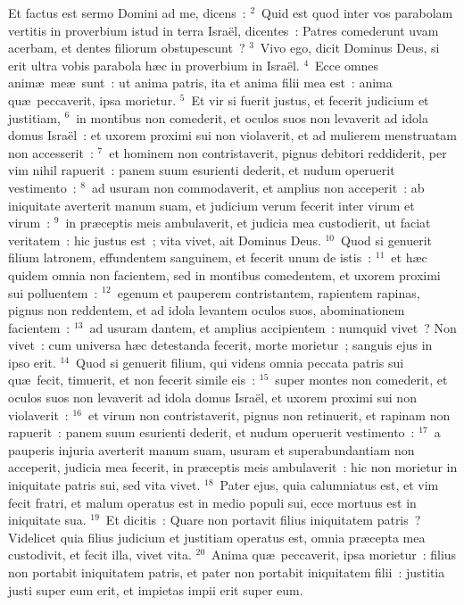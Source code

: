 \bchapter
\lettrine[lines=3,image=true,loversize=0.05,lraise=-0.03]{E}{}t factus est sermo Domini ad me, dicens~:
${}^{2}$~Quid est quod inter vos parabolam vertitis in proverbium istud in terra Isra\"el, dicentes~: Patres comederunt uvam acerbam, et dentes filiorum obstupescunt~?
${}^{3}$~Vivo ego, dicit Dominus Deus, si erit ultra vobis parabola h\ae c in proverbium in Isra\"el.
${}^{4}$~Ecce omnes anim\ae\ me\ae\ sunt~: ut anima patris, ita et anima filii mea est~: anima qu\ae\ peccaverit, ipsa morietur.
${}^{5}$~Et vir si fuerit justus, et fecerit judicium et justitiam,
${}^{6}$~in montibus non comederit, et oculos suos non levaverit ad idola domus Isra\"el~: et uxorem proximi sui non violaverit, et ad mulierem menstruatam non accesserit~:
${}^{7}$~et hominem non contristaverit, pignus debitori reddiderit, per vim nihil rapuerit~: panem suum esurienti dederit, et nudum operuerit vestimento~:
${}^{8}$~ad usuram non commodaverit, et amplius non acceperit~: ab iniquitate averterit manum suam, et judicium verum fecerit inter virum et virum~:
${}^{9}$~in pr\ae ceptis meis ambulaverit, et judicia mea custodierit, ut faciat veritatem~: hic justus est~; vita vivet, ait Dominus Deus.
${}^{10}$~Quod si genuerit filium latronem, effundentem sanguinem, et fecerit unum de istis~:
${}^{11}$~et h\ae c quidem omnia non facientem, sed in montibus comedentem, et uxorem proximi sui polluentem~:
${}^{12}$~egenum et pauperem contristantem, rapientem rapinas, pignus non reddentem, et ad idola levantem oculos suos, abominationem facientem~:
${}^{13}$~ad usuram dantem, et amplius accipientem~: numquid vivet~? Non vivet~: cum universa h\ae c detestanda fecerit, morte morietur~; sanguis ejus in ipso erit.
${}^{14}$~Quod si genuerit filium, qui videns omnia peccata patris sui qu\ae\ fecit, timuerit, et non fecerit simile eis~:
${}^{15}$~super montes non comederit, et oculos suos non levaverit ad idola domus Isra\"el, et uxorem proximi sui non violaverit~:
${}^{16}$~et virum non contristaverit, pignus non retinuerit, et rapinam non rapuerit~: panem suum esurienti dederit, et nudum operuerit vestimento~:
${}^{17}$~a pauperis injuria averterit manum suam, usuram et superabundantiam non acceperit, judicia mea fecerit, in pr\ae ceptis meis ambulaverit~: hic non morietur in iniquitate patris sui, sed vita vivet.
${}^{18}$~Pater ejus, quia calumniatus est, et vim fecit fratri, et malum operatus est in medio populi sui, ecce mortuus est in iniquitate sua.
${}^{19}$~Et dicitis~: Quare non portavit filius iniquitatem patris~? Videlicet quia filius judicium et justitiam operatus est, omnia pr\ae cepta mea custodivit, et fecit illa, vivet vita.
${}^{20}$~Anima qu\ae\ peccaverit, ipsa morietur~: filius non portabit iniquitatem patris, et pater non portabit iniquitatem filii~: justitia justi super eum erit, et impietas impii erit super eum.


